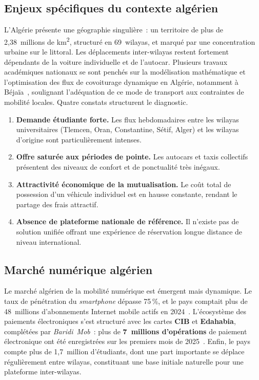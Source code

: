 \subsection{Enjeux spécifiques du contexte algérien}
\label{sec:transport-algerie}

L'Algérie présente une géographie singulière~: un territoire de plus de 2,38~millions de km\textsuperscript{2}, structuré en 69~wilayas, et marqué par une concentration urbaine sur le littoral. Les déplacements inter-wilayas restent fortement dépendants de la voiture individuelle et de l'autocar. Plusieurs travaux académiques nationaux se sont penchés sur la modélisation mathématique et l'optimisation des flux de covoiturage dynamique en Algérie, notamment à Béjaïa~\cite{bouzidi_covoiturage_dz_2022}, soulignant l'adéquation de ce mode de transport aux contraintes de mobilité locales. Quatre constats structurent le diagnostic.
\begin{enumerate}
  \item \textbf{Demande étudiante forte.} Les flux hebdomadaires entre les wilayas universitaires (Tlemcen, Oran, Constantine, Sétif, Alger) et les wilayas d'origine sont particulièrement intenses.
  \item \textbf{Offre saturée aux périodes de pointe.} Les autocars et taxis collectifs présentent des niveaux de confort et de ponctualité très inégaux.
  \item \textbf{Attractivité économique de la mutualisation.} Le coût total de possession d'un véhicule individuel est en hausse constante, rendant le partage des frais attractif.
  \item \textbf{Absence de plateforme nationale de référence.} Il n'existe pas de solution unifiée offrant une expérience de réservation longue distance de niveau international.
\end{enumerate}

\subsection{Marché numérique algérien}
\label{sec:opportunite-marche}

Le marché algérien de la mobilité numérique est émergent mais dynamique. Le taux de pénétration du \textit{smartphone} dépasse 75\,\%, et le pays comptait plus de 48~millions d'abonnements Internet mobile actifs en 2024~\cite{arpt_2024}. L'écosystème des paiements électroniques s'est structuré avec les cartes \textbf{CIB} et \textbf{Edahabia}, complétées par \textit{Baridi~Mob}~: plus de \textbf{7~millions d'opérations} de paiement électronique ont été enregistrées sur les premiers mois de 2025~\cite{aps_epaiement_2025}. Enfin, le pays compte plus de 1,7~million d'étudiants, dont une part importante se déplace régulièrement entre wilayas, constituant une base initiale naturelle pour une plateforme inter-wilayas.


